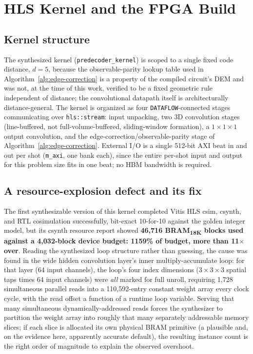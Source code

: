 \documentclass[pdflatex,sn-basic]{sn-jnl}
\begin{document}
\section{HLS Kernel and the FPGA Build}\label{sec:hls}

\subsection{Kernel structure}\label{subsec:hls-structure}
The synthesized kernel (\texttt{predecoder\_kernel}) is scoped to a single fixed code distance, \(d=5\), because the observable-parity lookup table used in Algorithm~\ref{alg:edge-correction} is a property of the compiled circuit's DEM and was not, at the time of this work, verified to be a fixed geometric rule independent of distance; the convolutional datapath itself is architecturally distance-general. The kernel is organized as four \texttt{DATAFLOW}-connected stages communicating over \texttt{hls::stream}: input unpacking, two 3D convolution stages (line-buffered, not full-volume-buffered, sliding-window formation), a \(1\times1\times1\) output convolution, and the edge-correction/observable-parity stage of Algorithm~\ref{alg:edge-correction}. External I/O is a single 512-bit AXI beat in and out per shot (\texttt{m\_axi}, one bank each), since the entire per-shot input and output for this problem size fits in one beat; no HBM bandwidth is required.

\subsection{A resource-explosion defect and its fix}\label{subsec:results-hls}

The first synthesizable version of this kernel completed Vitis HLS csim, csynth, and RTL cosimulation successfully, bit-exact 10-for-10 against the golden integer model, but its csynth resource report showed \textbf{46{,}716 BRAM\textsubscript{18K} blocks used against a 4{,}032-block device budget: 1159\% of budget, more than 11\(\times\) over}. Reading the synthesized loop structure rather than guessing, the cause was found in the wide hidden convolution layer's inner multiply-accumulate loop: for that layer (64 input channels), the loop's four index dimensions (\(3\times3\times3\) spatial taps times 64 input channels) were \emph{all} marked for full unroll, requiring 1{,}728 simultaneous parallel reads into a 110{,}592-entry constant weight array every clock cycle, with the read offset a function of a runtime loop variable. Serving that many simultaneous dynamically-addressed reads forces the synthesizer to partition the weight array into roughly that many separately addressable memory slices; if each slice is allocated its own physical BRAM primitive (a plausible and, on the evidence here, apparently accurate default), the resulting instance count is the right order of magnitude to explain the observed overshoot.
\end{document}
